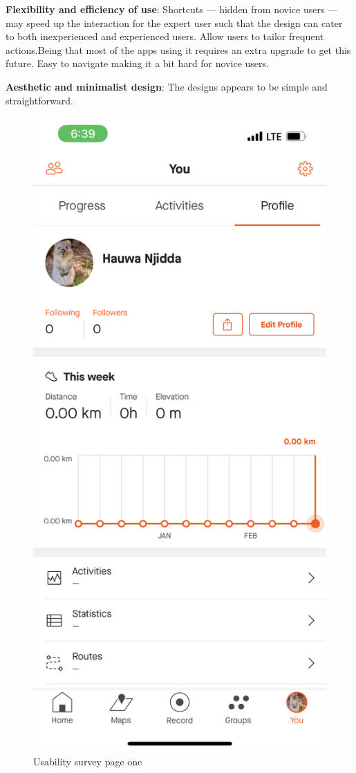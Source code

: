 \documentclass{l4proj}
\begin{document}
\textbf{Flexibility and efficiency of use}: Shortcuts — hidden from novice users — may speed up the interaction for the expert user such that the design can cater to both inexperienced and experienced users. Allow users to tailor frequent actions.Being that most of the apps using it requires an extra upgrade to get this future. Easy to navigate making it a bit hard for novice users. 

\textbf{Aesthetic and minimalist design}: The designs appears to be simple and straightforward.  
\begin{figure}[h!]
    \centering
    \includegraphics[scale=0.09]{images/STAR.PNG}
    \caption{Usability survey page one}
    \label{fig:surveypage1}
\end{figure}
\end{document}
